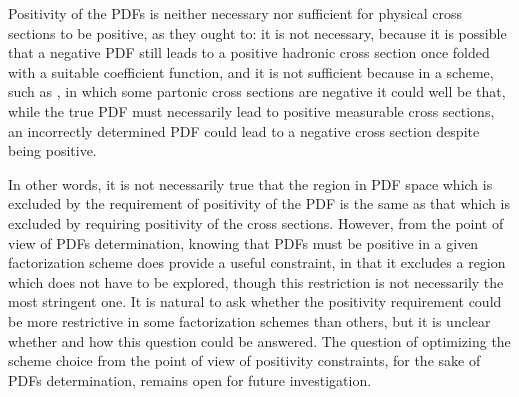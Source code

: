 Positivity of the PDFs is neither necessary nor sufficient for physical
cross sections to be positive, as they ought to: it is not necessary,
because it is possible that a negative PDF still leads to a positive
hadronic cross section once folded with a suitable coefficient
function, and it is not sufficient because in a scheme, such as
\msbar{},
in which some partonic cross sections are negative it could well be
that, while the true PDF must necessarily lead to positive measurable
cross sections,  an incorrectly determined PDF could lead to a negative
cross section despite being positive.

In other words, it is not necessarily true that 
the region in PDF space which is excluded by the requirement of
positivity of the PDF is the same as that which is excluded by
requiring positivity of the cross sections. However, from the point of
view of PDFs determination, knowing that PDFs must be
positive in a given factorization scheme does provide a useful constraint,
in that it excludes a region which does not have to be explored,
though this restriction is not necessarily the most stringent one. It
is natural to ask whether the positivity requirement could be
more restrictive in some factorization schemes than others, but it is
unclear whether and how this question could be answered. The question
of optimizing the scheme choice from the point of view of positivity
constraints, for the sake of PDFs determination, remains open for
future investigation.

